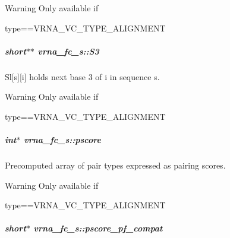\begin{DoxyWarning}{Warning}
Only available if\begin{DoxyVerb}type==VRNA_VC_TYPE_ALIGNMENT \end{DoxyVerb}
 
\end{DoxyWarning}
\subparagraph[{\texorpdfstring{S3}{S3}}]{\setlength{\rightskip}{0pt plus 5cm}short$\ast$$\ast$ vrna\+\_\+fc\+\_\+s\+::\+S3}\hypertarget{group__fold__compound_af6ab2a25b84d2308ee23f6b11b5fd52d}{}\label{group__fold__compound_af6ab2a25b84d2308ee23f6b11b5fd52d}


Sl\mbox{[}s\mbox{]}\mbox{[}i\mbox{]} holds next base 3\textquotesingle{} of i in sequence s. 

\begin{DoxyWarning}{Warning}
Only available if\begin{DoxyVerb}type==VRNA_VC_TYPE_ALIGNMENT \end{DoxyVerb}
 
\end{DoxyWarning}
\subparagraph[{\texorpdfstring{pscore}{pscore}}]{\setlength{\rightskip}{0pt plus 5cm}int$\ast$ vrna\+\_\+fc\+\_\+s\+::pscore}\hypertarget{group__fold__compound_a14dc7755af6019ddbd0cf94b209e89dd}{}\label{group__fold__compound_a14dc7755af6019ddbd0cf94b209e89dd}


Precomputed array of pair types expressed as pairing scores. 

\begin{DoxyWarning}{Warning}
Only available if\begin{DoxyVerb}type==VRNA_VC_TYPE_ALIGNMENT \end{DoxyVerb}
 
\end{DoxyWarning}
\subparagraph[{\texorpdfstring{pscore\+\_\+pf\+\_\+compat}{pscore_pf_compat}}]{\setlength{\rightskip}{0pt plus 5cm}short$\ast$ vrna\+\_\+fc\+\_\+s\+::pscore\+\_\+pf\+\_\+compat}\hypertarget{group__fold__compound_abf5e82d14649b6179ae60ed7da6e4fc0}{}\label{group__fold__compound_abf5e82d14649b6179ae60ed7da6e4fc0}


